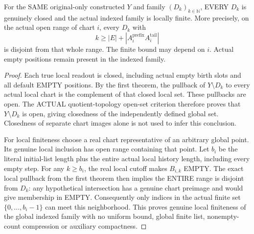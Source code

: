 \begin{theorem}
\label{hir:sharp-actual-global-birth-boundary-locally-finite}
\leanok
For the SAME original-only constructed $Y$ and family $(D_k)_{k\in\mathbb N}$,
EVERY $D_k$ is genuinely closed and the actual indexed family is locally
finite. More precisely, on the actual open range of chart $i$, every
$D_k$ with
\[
 k\geq |E|+|A_i^{\mathrm{prefix}}A_i^{\mathrm{tail}}|
\]
is disjoint from that whole range. The finite bound may depend on $i$.
Actual empty positions remain present in the indexed family.
\end{theorem}
\begin{proof}
Each true local readout is closed, including actual empty birth slots and
all default EMPTY positions. By the first theorem, the pullback of $Y\setminus
D_k$ to every actual local chart is the complement of that closed local
set. These pullbacks are open. The ACTUAL quotient-topology open-set
criterion therefore proves that $Y\setminus D_k$ is open, giving closedness
of the independently defined global set. Closedness of separate chart
images alone is not used to infer this conclusion.

For local finiteness choose a real chart representative of an arbitrary
global point. Its genuine local inclusion has open range containing that
point. Let $b_i$ be the literal initial-list length plus the entire actual
local history length, including every empty step. For any $k\geq b_i$,
the real local cutoff makes $B_{i,k}$ EMPTY. The exact local pullback from
the first theorem then implies the ENTIRE range is disjoint from $D_k$:
any hypothetical intersection has a genuine chart preimage and would
give membership in EMPTY. Consequently only indices in the actual finite
set $\{0,\ldots,b_i-1\}$ can meet this neighborhood. This proves genuine
local finiteness of the global indexed family with no uniform bound,
global finite list, nonempty-count compression or auxiliary compactness.
\end{proof}

